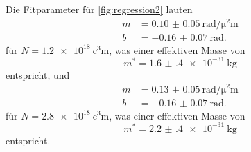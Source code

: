 Die Fitparameter für \autoref{fig:regression2} lauten
\begin{align*}
    m &= \qty{0.10(5)}{\radian\per\square\micro\meter} \\
    b &= \qty{-0.16(7)}{\radian}.
\end{align*}
für $N = \qty{1.2e18}{\cubic\centi\meter}$, was einer effektiven Masse von
\begin{equation*}
    m^* = \qty{1.6(4)e-31}{\kilo\gram}
\end{equation*}
entspricht, und
\begin{align*}
    m &= \qty{0.13(5)}{\radian\per\square\micro\meter} \\
    b &= \qty{-0.16(7)}{\radian}.
\end{align*}
für $N = \qty{2.8e18}{\cubic\centi\meter}$, was einer effektiven Masse von
\begin{equation*}
    m^* = \qty{2.2(4)e-31}{\kilo\gram}
\end{equation*} 
entspricht.